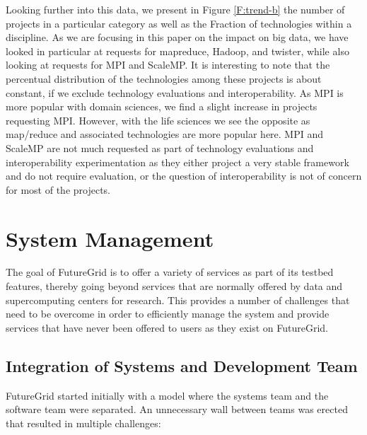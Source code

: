 \documentclass[graybox]{svmult}
\begin{document}
Looking further into this data, we present in Figure \ref{F:trend-b} the number of projects in a particular category as well as the Fraction of technologies within a discipline. As we are focusing in this paper on the impact on big data, we have looked in particular at requests for mapreduce, Hadoop, and twister, while also looking at requests for MPI and ScaleMP. It is interesting to note that the percentual distribution of the technologies among these projects is about constant, if we exclude technology evaluations and interoperability. As MPI is more popular with domain sciences, we find a slight increase in projects requesting MPI. However, with the life sciences we see the opposite as map/reduce and associated technologies are more popular here. MPI and ScaleMP are not much requested as part of technology evaluations and interoperability experimentation as they either project a very stable framework and do not require evaluation, or the question of interoperability is not of concern for most of the projects.  










\section{System Management}\label{S:devops}

The goal of FutureGrid is to offer a variety of services as part of its testbed features, thereby going beyond services that are normally offered by data and supercomputing centers for research. This provides a number of challenges that need to be overcome in order to efficiently manage the system and provide services that have never been offered to users as they exist on FutureGrid.

\subsection{Integration of Systems and Development Team}

FutureGrid started initially with a model where the systems team and the software team were separated. An unnecessary wall between teams was erected that resulted in multiple challenges:
\end{document}
